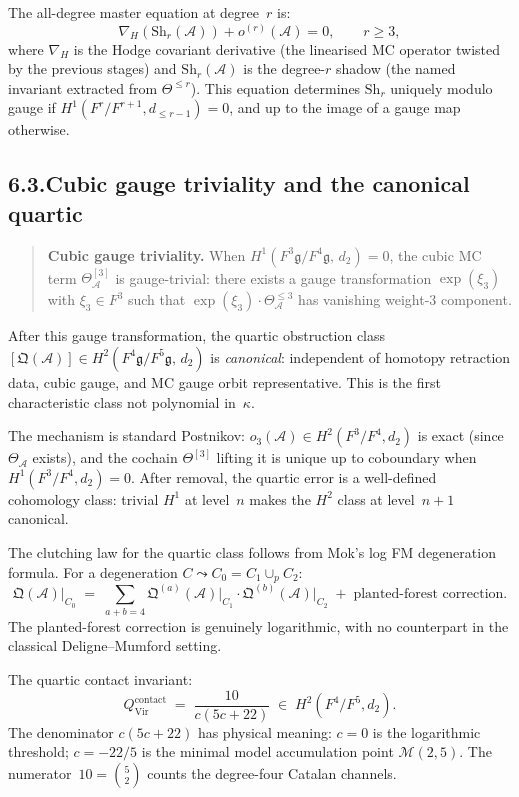 \documentclass[11pt]{report}
\theoremstyle{definition}
\theoremstyle{remark}
\providecommand{\cA}{\mathcal{A}}
\numberwithin{equation}{section}
\begin{document}
The all-degree master equation at degree~$r$ is:
\[
\nabla_H(\mathrm{Sh}_r(\cA))+o^{(r)}(\cA)=0,
\qquad r\ge 3,
\]
where $\nabla_H$ is the Hodge covariant derivative (the linearised
MC operator twisted by the previous stages) and $\mathrm{Sh}_r(\cA)$
is the degree-$r$ shadow (the named invariant extracted from
$\Theta^{\le r}$). This equation determines $\mathrm{Sh}_r$
uniquely modulo gauge if $H^1(F^r/F^{r+1},d_{\le r-1})=0$, and
up to the image of a gauge map otherwise.

\subsection*{6.3.\enspace Cubic gauge triviality and the canonical quartic}

\begin{quote}
\textbf{Cubic gauge triviality.}\enspace
When $H^1(F^3\mathfrak g/F^4\mathfrak g,\,d_2)=0$, the cubic MC
term $\Theta^{[3]}_\cA$ is gauge-trivial: there exists a gauge
transformation $\exp(\xi_3)$ with $\xi_3\in F^3$ such that
$\exp(\xi_3)\cdot\Theta^{\le 3}_\cA$ has vanishing weight-$3$
component.
\end{quote}

After this gauge transformation, the quartic obstruction class
$[\mathfrak Q(\cA)]\in H^2(F^4\mathfrak g/F^5\mathfrak g,\,d_2)$
is \emph{canonical}: independent of homotopy
retraction data, cubic gauge, and MC gauge orbit representative.
This is the first characteristic class
not polynomial in~$\kappa$.

The mechanism is standard Postnikov:
$o_3(\cA)\in H^2(F^3/F^4,d_2)$ is exact (since
$\Theta_\cA$ exists), and the cochain $\Theta^{[3]}$
lifting it is unique up to coboundary when
$H^1(F^3/F^4,d_2)=0$. After removal, the quartic error is a
well-defined cohomology class: trivial $H^1$ at level~$n$ makes the $H^2$ class at
level~$n+1$ canonical.

The clutching law for the quartic class follows from Mok's log
FM degeneration formula. For a degeneration
$C\leadsto C_0=C_1\cup_p C_2$:
\[
\mathfrak Q(\cA)\big|_{C_0}
\;=\;
\sum_{a+b=4}\mathfrak Q^{(a)}(\cA)\big|_{C_1}
\cdot\mathfrak Q^{(b)}(\cA)\big|_{C_2}
\;+\;
\text{planted-forest correction}.
\]
The planted-forest correction is genuinely logarithmic,
with no counterpart in the classical Deligne--Mumford setting.

The quartic contact invariant:
\[
Q^{\mathrm{contact}}_{\mathrm{Vir}}
\;=\;
\frac{10}{c(5c+22)}
\;\in\;
H^2(F^4/F^5,d_2).
\]
The denominator $c(5c+22)$ has physical meaning: $c=0$ is the
logarithmic threshold; $c=-22/5$ is the minimal model accumulation
point $\mathcal M(2,5)$. The numerator~$10=\binom{5}{2}$ counts
the degree-four Catalan channels.
\end{document}
